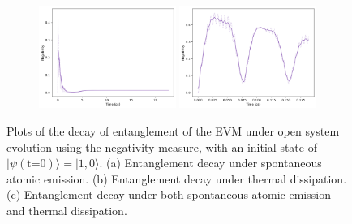 \documentclass[11pt]{article}
\begin{document}
\begin{figure}[H]
    \vspace{0.8em}

    \begin{subfigure}{\textwidth}
        \centering
        \includegraphics[width=0.49\textwidth]{Research Project/Code/results/ExVib/Open/Negativity/Envelope/neg_both_e0.png}
        \hfill
        \includegraphics[width=0.49\textwidth]{Research Project/Code/results/ExVib/Open/Negativity/Fast/neg_both_e0.png}
        \caption{}
        \label{fig:EVM_OQS_Neg_both_e0}
    \end{subfigure}
    \caption{Plots of the decay of entanglement of the EVM under open system evolution using the negativity measure, with an initial state of $|\psi (\text{t=0})\rangle = |1, 0\rangle$. (a) Entanglement decay under spontaneous atomic emission. (b) Entanglement decay under thermal dissipation. (c) Entanglement decay under both spontaneous atomic emission and thermal dissipation.}
    \label{fig:EVM_OQS_Neg}
\end{figure}
\end{document}
